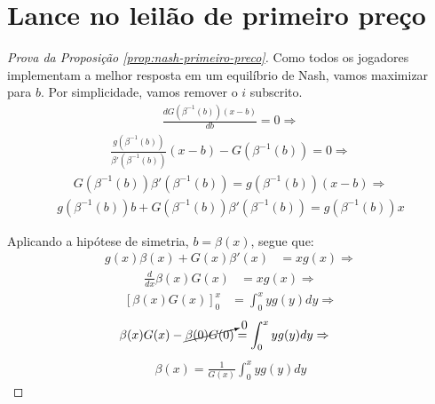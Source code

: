 \section{Lance no leilão de primeiro preço}
\begin{proof}[Prova da Proposição \ref{prop:nash-primeiro-preco}]
	Como todos os jogadores implementam a melhor resposta em um equilíbrio de Nash, vamos maximizar para $b$. Por simplicidade, vamos remover o $i$ subscrito.
	\begin{align*}
		\frac{d G(\beta^{-1}(b)) (x - b)}{db} = 0 \Rightarrow
	\end{align*}
	\begin{align*}
		\frac{ g( \beta^{-1}(b) ) }{ \beta'( \beta^{-1}(b) ) }(x - b) - G( \beta^{-1}(b) ) = 0 \Rightarrow
	\end{align*}
	\begin{align*}
		G( \beta^{-1}(b) )\beta'( {\beta^{-1}(b)} ) = g( \beta^{-1}(b) )(x - b) \Rightarrow
	\end{align*}
	\begin{align*}
		g(\beta^{-1}(b))b + G(\beta^{-1}(b))\beta'({\beta^{-1}(b)}) = g(\beta^{-1}(b))x
	\end{align*}

	Aplicando a hipótese de simetria, $b = \beta(x)$, segue que:
	\begin{align*}
		g(x)\beta(x) + G(x)\beta'(x) & = xg(x) \Rightarrow
	\end{align*}
	\begin{align*}
		\frac{d}{dx} \beta(x)G(x) & = xg(x) \Rightarrow
	\end{align*}
	\begin{align*}
		\left[ \beta(x)G(x) \right]_{0}^{x} & = \int_{0}^{x} yg(y)dy \Rightarrow
	\end{align*}
	\begin{align*}
		\beta(x)G(x) - \cancelto{0}{\beta(0)G(0)} & = \int_{0}^{x} yg(y)dy \Rightarrow
	\end{align*}
	\begin{align*}
		\beta(x) = \frac{1}{G(x)} \int_{0}^{x} yg(y)dy
	\end{align*}
\end{proof}

